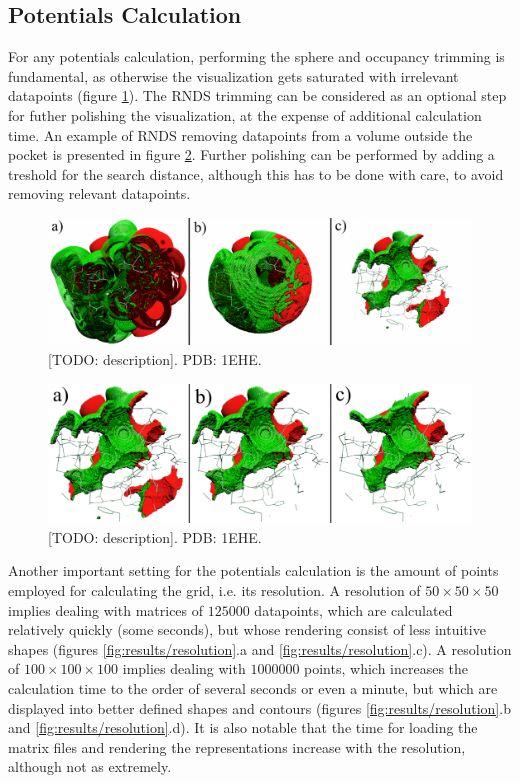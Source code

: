   \subsection{Potentials Calculation}
    For any potentials calculation, performing the sphere and occupancy trimming is fundamental, as otherwise the visualization gets saturated with irrelevant datapoints (figure \ref{fig:results/trimming_0}). The RNDS trimming can be considered as an optional step for futher polishing the visualization, at the expense of additional calculation time. An example of RNDS removing datapoints from a volume outside the pocket is presented in figure \ref{fig:results/trimming_1}. Further polishing can be performed by adding a treshold for the search distance, although this has to be done with care, to avoid removing relevant datapoints.

    \begin{figure}[H]
      \centering
      \includegraphics[width=1\textwidth]{figures/results/trimming_0.png}
      \caption{\label{fig:results/trimming_0} [TODO: description]. PDB: 1EHE.}
    \end{figure}

    \begin{figure}[H]
      \centering
      \includegraphics[width=1\textwidth]{figures/results/trimming_1.png}
      \caption{\label{fig:results/trimming_1} [TODO: description]. PDB: 1EHE.}
    \end{figure}

    Another important setting for the potentials calculation is the amount of points employed for calculating the grid, i.e. its resolution. A resolution of $50 \times 50 \times 50$ implies dealing with matrices of $125000$ datapoints, which are calculated relatively quickly (some seconds), but whose rendering consist of less intuitive shapes (figures \ref{fig:results/resolution}.a and \ref{fig:results/resolution}.c). A resolution of $100 \times 100 \times 100$ implies dealing with $1000000$ points, which increases the calculation time to the order of several seconds or even a minute, but which are displayed into better defined shapes and contours (figures \ref{fig:results/resolution}.b and \ref{fig:results/resolution}.d). It is also notable that the time for loading the matrix files and rendering the representations increase with the resolution, although not as extremely.

